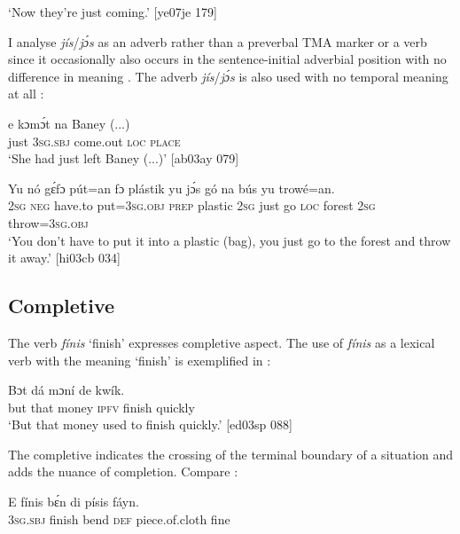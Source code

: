 \glt ‘Now they’re just coming.’ [ye07je 179]
\z

I analyse \textit{jís}{{/}}\textit{jɔ́s} as an adverb rather than a preverbal TMA marker or a verb since it occasionally also occurs in the sentence-initial adverbial position with no difference in meaning . The adverb \textit{jís}{{/}}\textit{jɔ́s} is also used with no temporal meaning at all : 


\ea%
    \label{ex:key:360}
    \gll {}  e    kɔmɔ́t    na  Baney  (...)\\
just  \textsc{3sg.sbj}  come.out  \textsc{loc}  \textsc{place}\\

\glt ‘She had just left Baney (...)’ [ab03ay 079]
\z


\ea%
    \label{ex:key:361}
    \gll Yu  nó  gɛ́fɔ    pút=an    fɔ  plástik  yu  jɔ́s  gó
na  bús    yu  trowé=an.\\
\textsc{2sg}  \textsc{neg}  have.to  put=\textsc{3sg.obj}  \textsc{prep}  plastic  \textsc{2sg}  just  go
\textsc{loc}  forest  \textsc{2sg}  throw=\textsc{3sg.obj}\\

\glt ‘You don’t have to put it into a plastic (bag), you just go to the 
forest and throw it away.’ [hi03cb 034]
\z

\subsection{Completive}\label{sec:6.4.3}

The verb \textit{fínis} ‘finish’ expresses completive aspect. The use of \textit{fínis} as a lexical verb with the meaning ‘finish’ is exemplified in : 

\ea%
    \label{ex:key:362}
    \gll Bɔt  dá  mɔní  de      kwík.\\
but  that  money  \textsc{ipfv}  finish  quickly\\

\glt ‘But that money used to finish quickly.’ [ed03sp 088]
\z

The completive indicates the crossing of the terminal boundary of a situation and adds the nuance of completion. Compare :


\ea%
    \label{ex:key:363}
    \gll E    fínis  bɛ́n    di  písis        fáyn.\\
\textsc{3sg.sbj}  finish  bend  \textsc{def}  piece.of.cloth    fine\\

